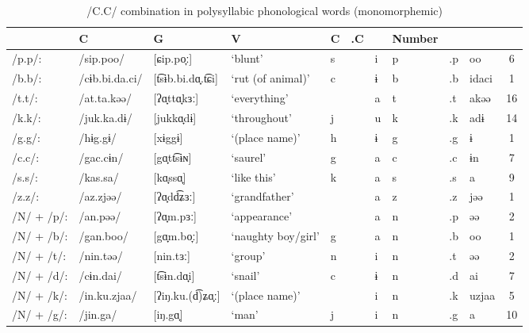 \begin{sidewaystable}
\caption{/C.C/ combination in polysyllabic phonological words (monomorphemic)}
\begin{tabular}{ *{10}{l} S[table-format=1] }
\lsptoprule
{} &   C & G & V & C  & .C  & &  {Number}\\\midrule
{/p.p/:}     & {/sip.poo/}       & [ɕip.po̞ː]          &  {‘blunt’}             &  s  &  &    i  &  p   &  .p  & oo & 6\\
{/b.b/:}     & {/cɨb.bi.da.ci/}  & [t͡sɨb.bi.dɑ̟.t͡ɕi] &  {‘rut (of animal)’}   &  c  &  &    ɨ  &  b   &  .b  & idaci &  1\\
{/t.t/:}     & {/at.ta.kəə/}     & [ʔɑ̟ttɑ̟kɜː]        &   {‘everything’}       & &  & a   &     t &  .t  &   akəə  & 16\\
{/k.k/:}     & {/juk.ka.dɨ/}     & [jukkɑ̟dɨ]          &  {‘throughout’}        &  j  &  &    u  &  k   &  .k &  adɨ & 14\\
{/g.g/:}     & {/hɨg.gɨ/}        & [xɨggɨ]             & {‘(place name)’}       & h   &  &   ɨ   & g    & .g &  ɨ &  1\\
{/c.c/:}     & {/gac.cɨn/}       & [gɑ̟tt͡sɨɴ]         &  {‘saurel’}            &  g  &  &    a  &  c   &  .c &  ɨn &  7\\
{/s.s/:}     & {/kas.sa/}        & [kɑ̟ssɑ̟]           &   {‘like this’}        &   k &  &     a &   s  &   .s &  a &  9\\
{/z.z/:}     & {/az.zjəə/}       & [ʔɑ̟dd͡ʑɜː]         &  {‘grandfather’}      & & &  a   &    z  & .z   &  jəə &  1\\
{/N/ + /p/:} & {/an.pəə/}        & [ʔɑ̟m.pɜː]          &  {‘appearance’}       & & & a   &    n  & .p   &  əə &  2\\
{/N/ + /b/:} & {/gan.boo/}       & [gɑ̟m.bo̞ː]         &   {‘naughty boy/girl’} &   g &   &     a &   n  &   .b & oo &  1\\
{/N/ + /t/:} & {/nin.təə/}       & [nin.tɜː]           & {‘group’}              & n   & &   i   & n    & .t  & əə & 2\\
{/N/ + /d/:} & {/cɨn.dai/}       & [t͡sɨn.dɑ̟i]        &  {‘snail’}             &  c  &  &    ɨ  &  n   &  .d & ai & 7\\
{/N/ + /k/:} & {/in.ku.zjaa/}    & [ʔiŋ.ku.(d͡)ʑɑ̟ː]   &  {‘(place name)’}      & & & i &    n  & .k   &  uzjaa & 5\\
{/N/ + /g/:} & {/jin.ga/}        & [iŋ.gɑ̟]            &  {‘man’}               &  j  & &    i  &  n   &  .g & a & 10\\

\end{tabular}
\end{sidewaystable}
